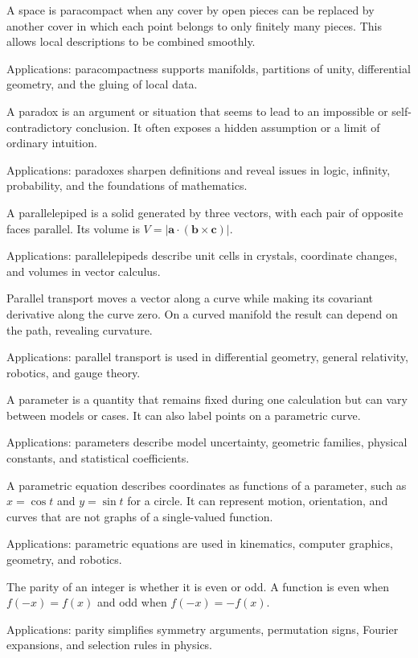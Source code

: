 A space is paracompact when any cover by open pieces can be replaced by another cover in which each point belongs to only finitely many pieces. This allows local descriptions to be combined smoothly. \par\noindent Applications: paracompactness supports manifolds, partitions of unity, differential geometry, and the gluing of local data.

A paradox is an argument or situation that seems to lead to an impossible or self-contradictory conclusion. It often exposes a hidden assumption or a limit of ordinary intuition. \par\noindent Applications: paradoxes sharpen definitions and reveal issues in logic, infinity, probability, and the foundations of mathematics.

A parallelepiped is a solid generated by three vectors, with each pair of opposite faces parallel. Its volume is $V=|\mathbf a\cdot(\mathbf b\times\mathbf c)|$. \par\noindent Applications: parallelepipeds describe unit cells in crystals, coordinate changes, and volumes in vector calculus.

Parallel transport moves a vector along a curve while making its covariant derivative along the curve zero. On a curved manifold the result can depend on the path, revealing curvature. \par\noindent Applications: parallel transport is used in differential geometry, general relativity, robotics, and gauge theory.

A parameter is a quantity that remains fixed during one calculation but can vary between models or cases. It can also label points on a parametric curve. \par\noindent Applications: parameters describe model uncertainty, geometric families, physical constants, and statistical coefficients.

A parametric equation describes coordinates as functions of a parameter, such as $x=\cos t$ and $y=\sin t$ for a circle. It can represent motion, orientation, and curves that are not graphs of a single-valued function. \par\noindent Applications: parametric equations are used in kinematics, computer graphics, geometry, and robotics.

The parity of an integer is whether it is even or odd. A function is even when $f(-x)=f(x)$ and odd when $f(-x)=-f(x)$. \par\noindent Applications: parity simplifies symmetry arguments, permutation signs, Fourier expansions, and selection rules in physics.

